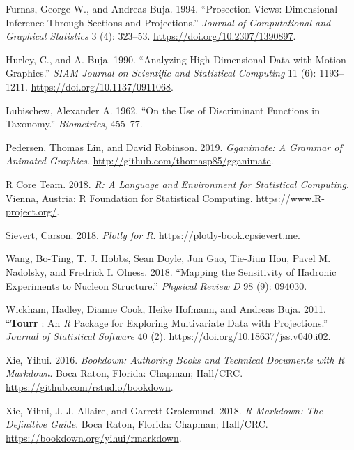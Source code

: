 \leavevmode\hypertarget{ref-furnas_prosection_1994}{}%
Furnas, George W., and Andreas Buja. 1994. ``Prosection Views: Dimensional Inference Through Sections and Projections.'' \emph{Journal of Computational and Graphical Statistics} 3 (4): 323--53. \url{https://doi.org/10.2307/1390897}.

\leavevmode\hypertarget{ref-hurley_analyzing_1990}{}%
Hurley, C., and A. Buja. 1990. ``Analyzing High-Dimensional Data with Motion Graphics.'' \emph{SIAM Journal on Scientific and Statistical Computing} 11 (6): 1193--1211. \url{https://doi.org/10.1137/0911068}.

\leavevmode\hypertarget{ref-lubischew_use_1962}{}%
Lubischew, Alexander A. 1962. ``On the Use of Discriminant Functions in Taxonomy.'' \emph{Biometrics}, 455--77.

\leavevmode\hypertarget{ref-pedersen_gganimate:_2019}{}%
Pedersen, Thomas Lin, and David Robinson. 2019. \emph{Gganimate: A Grammar of Animated Graphics}. \url{http://github.com/thomasp85/gganimate}.

\leavevmode\hypertarget{ref-r_core_team_r:_2018}{}%
R Core Team. 2018. \emph{R: A Language and Environment for Statistical Computing}. Vienna, Austria: R Foundation for Statistical Computing. \url{https://www.R-project.org/}.

\leavevmode\hypertarget{ref-sievert_plotly_2018}{}%
Sievert, Carson. 2018. \emph{Plotly for R}. \url{https://plotly-book.cpsievert.me}.

\leavevmode\hypertarget{ref-wang_mapping_2018}{}%
Wang, Bo-Ting, T. J. Hobbs, Sean Doyle, Jun Gao, Tie-Jiun Hou, Pavel M. Nadolsky, and Fredrick I. Olness. 2018. ``Mapping the Sensitivity of Hadronic Experiments to Nucleon Structure.'' \emph{Physical Review D} 98 (9): 094030.

\leavevmode\hypertarget{ref-wickham_tourr_2011}{}%
Wickham, Hadley, Dianne Cook, Heike Hofmann, and Andreas Buja. 2011. ``\textbf{Tourr} : An \emph{R} Package for Exploring Multivariate Data with Projections.'' \emph{Journal of Statistical Software} 40 (2). \url{https://doi.org/10.18637/jss.v040.i02}.

\leavevmode\hypertarget{ref-xie_bookdown:_2016}{}%
Xie, Yihui. 2016. \emph{Bookdown: Authoring Books and Technical Documents with R Markdown}. Boca Raton, Florida: Chapman; Hall/CRC. \url{https://github.com/rstudio/bookdown}.

\leavevmode\hypertarget{ref-xie_r_2018}{}%
Xie, Yihui, J. J. Allaire, and Garrett Grolemund. 2018. \emph{R Markdown: The Definitive Guide}. Boca Raton, Florida: Chapman; Hall/CRC. \url{https://bookdown.org/yihui/rmarkdown}.

